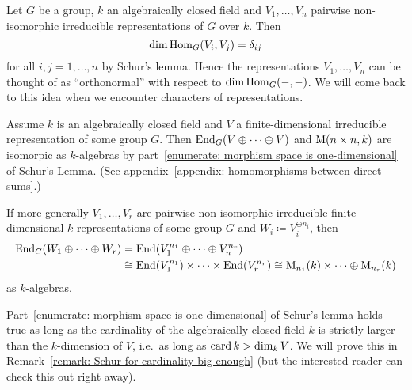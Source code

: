 

\begin{remark}
  Let $G$ be a group, $k$ an algebraically closed field and $V_1, \dotsc, V_n$ pairwise non-isomorphic irreducible representations of $G$ over $k$.
  Then
  \[
      \dim \operatorname{Hom}_G(V_i, V_j)
    = \delta_{ij}
  \]
  for all $i,j = 1, \dotsc, n$ by Schur’s lemma.
  Hence the representations $V_1, \dotsc, V_n$ can be thought of as “orthonormal” with respect to $\dim \operatorname{Hom}_G(-,-)$.
  We will come back to this idea when we encounter characters of representations.
\end{remark}


\begin{remark}
  Assume $k$ is an algebraically closed field and $V$ a finite-dimensional irreducible representation of some group $G$.
  Then $\operatorname{End}_G(V \oplus \dotsb \oplus V)$ and $\operatorname{M}(n \times n, k)$ are isomorpic as $k$-algebras by part~\ref{enumerate: morphism space is one-dimensional} of Schur’s Lemma.
  (See appendix~\ref{appendix: homomorphisms between direct sums}.)
  
  If more generally $V_1, \dotsc, V_r$ are pairwise non-isomorphic irreducible finite dimensional $k$-representations of some group $G$ and $W_i \coloneqq V_i^{\oplus n_i}$, then
  \begin{align*}
            \operatorname{End}_G(W_1 \oplus \dotsb \oplus W_r)
    &=      \operatorname{End}(V_1^{n_1} \oplus \dotsb \oplus V_n^{n_r})
    \\
    &\cong  \operatorname{End}(V_1^{n_1}) \times \dotsb \times \operatorname{End}(V_r^{n_r})
     \cong  \operatorname{M}_{n_1}(k) \times \dotsb \oplus \operatorname{M}_{n_r}(k)
  \end{align*}
  as $k$-algebras.
\end{remark}


\begin{remark}
  Part~\ref{enumerate: morphism space is one-dimensional} of Schur’s lemma holds true as long as the cardinality of the algebraically closed field $k$ is strictly larger than the $k$-dimension of $V$, i.e.\ as long as $\operatorname{card} k > \dim_k V$.
  We will prove this in Remark~\ref{remark: Schur for cardinality big enough} (but the interested reader can check this out right away).
\end{remark}


